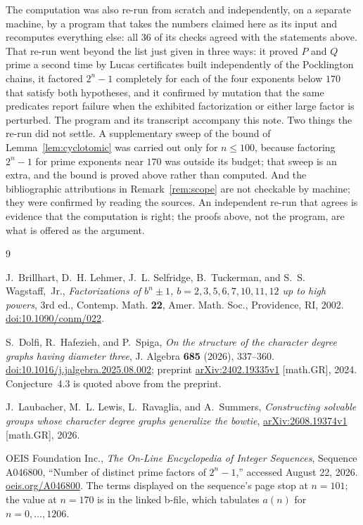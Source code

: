 \documentclass[11pt]{amsart}
\theoremstyle{remark}
\begin{document}
The computation was also re-run from scratch and independently, on a
separate machine, by a program that takes the numbers claimed here as
its input and recomputes everything else: all $36$ of its checks agreed
with the statements above. That re-run went beyond the list just given
in three ways: it proved $P$ and $Q$ prime a second time by Lucas
certificates built independently of the Pocklington chains, it
factored $2^n-1$ completely for each of the four exponents below $170$
that satisfy both hypotheses, and it confirmed by mutation that the
same predicates report failure when the exhibited factorization or
either large factor is perturbed. The program and its transcript
accompany this note. Two things the
re-run did not settle. A supplementary sweep of the bound of
Lemma~\ref{lem:cyclotomic} was carried out only for $n\le100$, because
factoring $2^n-1$ for prime exponents near $170$ was outside its
budget; that sweep is an extra, and the bound is proved above rather
than computed. And the bibliographic attributions in
Remark~\ref{rem:scope} are not checkable by machine; they were
confirmed by reading the sources. An independent re-run that agrees is
evidence that the computation is right; the proofs above, not the
program, are what is offered as the argument.

\begin{thebibliography}{9}

J.~Brillhart, D.~H. Lehmer, J.~L. Selfridge, B.~Tuckerman, and
S.~S. Wagstaff,~Jr.,
\emph{Factorizations of $b^n\pm1$, $b=2,3,5,6,7,10,11,12$ up to high
powers}, 3rd ed., Contemp. Math. \textbf{22},
Amer. Math. Soc., Providence, RI, 2002.
\href{https://doi.org/10.1090/conm/022}{doi:10.1090/conm/022}.

S.~Dolfi, R.~Hafezieh, and P.~Spiga,
\emph{On the structure of the character degree graphs having diameter three},
J. Algebra \textbf{685} (2026), 337--360.
\href{https://doi.org/10.1016/j.jalgebra.2025.08.002}
{doi:10.1016/j.jalgebra.2025.08.002};
preprint \href{https://arxiv.org/abs/2402.19335}{arXiv:2402.19335v1}
[math.GR], 2024. Conjecture~4.3 is quoted above from the preprint.

J.~Laubacher, M.~L. Lewis, L.~Ravaglia, and A.~Summers,
\emph{Constructing solvable groups whose character degree graphs
generalize the bowtie},
\href{https://arxiv.org/abs/2608.19374}{arXiv:2608.19374v1}
[math.GR], 2026.

OEIS Foundation Inc.,
\emph{The On-Line Encyclopedia of Integer Sequences},
Sequence A046800, ``Number of distinct prime factors of $2^n-1$,''
accessed August 22, 2026.
\href{https://oeis.org/A046800}{oeis.org/A046800}.
The terms displayed on the sequence's page stop at $n=101$; the value
at $n=170$ is in the linked b-file, which tabulates $a(n)$ for
$n=0,\dots,1206$.

\end{thebibliography}
\end{document}
